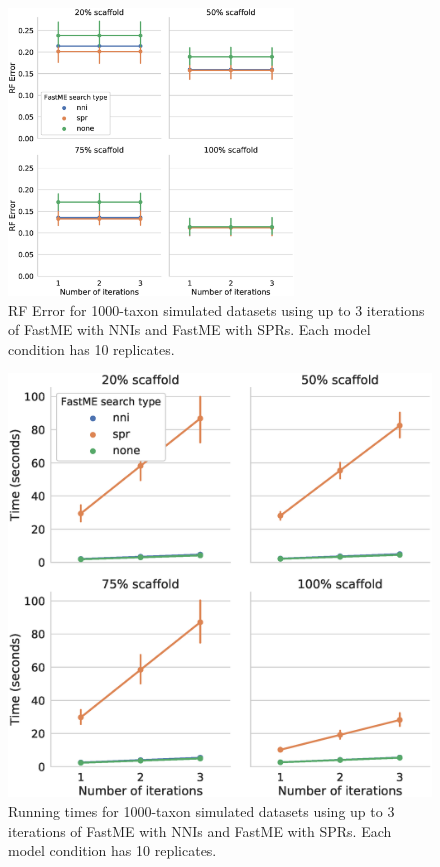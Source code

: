 \begin{figure}
    \centering
    \includegraphics[height=3in]{astrid-missing-figs/iterations-err.eps}
    \caption{RF Error for 1000-taxon simulated datasets using up to 3 iterations of FastME with NNIs and FastME with SPRs. Each model condition has 10 replicates.}
    \label{astrid-missing::fig:iterations-err}
\end{figure}


\begin{figure}
    \centering
    \includegraphics[width=\textwidth]{astrid-missing-figs/iterations-times.eps}
    \caption{Running times for 1000-taxon simulated datasets using up to 3 iterations of FastME with NNIs and FastME with SPRs. Each model condition has 10 replicates.}
    \label{astrid-missing::fig:iterations-times}
\end{figure}